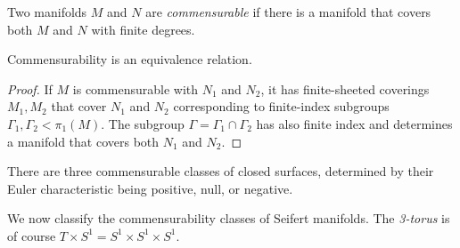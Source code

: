 \begin{defn}
Two manifolds $M$ and  $N$ are \emph{commensurable} if there is a manifold that covers both $M$ and $N$ with finite degrees.
\end{defn}

\begin{prop}
Commensurability is an equivalence relation.
\end{prop}
\begin{proof}
If $M$ is commensurable with $N_1$ and $N_2$, it has finite-sheeted coverings $M_1, M_2$ that cover $N_1$ and $N_2$ corresponding to finite-index subgroups $\Gamma_1, \Gamma_2 < \pi_1(M)$. The subgroup $\Gamma = \Gamma_1\cap \Gamma_2$ has also finite index and determines a manifold that covers both $N_1$ and $N_2$.
\end{proof}

\begin{ex}
There are three commensurable classes of closed surfaces, determined by their Euler characteristic being positive, null, or negative.
\end{ex}

We now classify the commensurability classes of Seifert manifolds. The \emph{3-torus} is of course $T\times S^1 = S^1\times S^1\times S^1$.

